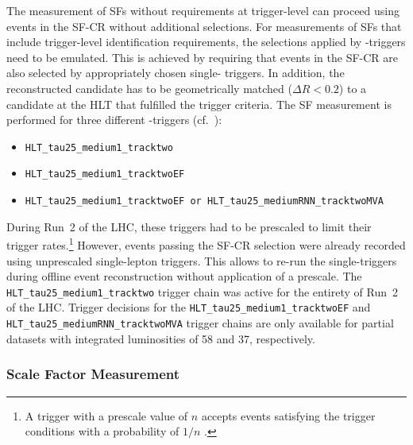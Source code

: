 The measurement of SFs without requirements at trigger-level can proceed using
events in the SF-CR without additional selections. For measurements of SFs that
include trigger-level identification requirements, the selections applied by
\tauhadvis-triggers need to be emulated. This is achieved by requiring that
events in the SF-CR are also selected by appropriately chosen single-\tauhadvis
triggers. In addition, the reconstructed \tauhadvis candidate has to be
geometrically matched ($\Delta R < 0.2$) to a \tauhadvis candidate at the HLT
that fulfilled the trigger criteria. The SF measurement is performed for three
different \tauhadvis-triggers (cf.\ ):
\begin{itemize}
\item \verb|HLT_tau25_medium1_tracktwo| %
\item \verb|HLT_tau25_medium1_tracktwoEF| %
\item \verb|HLT_tau25_medium1_tracktwoEF or HLT_tau25_mediumRNN_tracktwoMVA|
\end{itemize}
During Run~2 of the LHC, these triggers had to be prescaled to limit their
trigger rates.\footnote{A trigger with a prescale value of $n$ accepts events
  satisfying the trigger conditions with a probability of $1 / n$
  \cite{TRIG-2019-04}.} However, events passing the SF-CR selection were already
recorded using unprescaled single-lepton triggers. This allows to re-run the
single-\tauhadvis triggers during offline event reconstruction without
application of a prescale.
The \verb|HLT_tau25_medium1_tracktwo| trigger chain was active for the entirety
of Run~2 of the LHC. Trigger decisions for the
\verb|HLT_tau25_medium1_tracktwoEF| and \verb|HLT_tau25_mediumRNN_tracktwoMVA|
trigger chains are only available for partial datasets with integrated
luminosities of \SI{58}{\ifb} and \SI{37}{\ifb}, respectively.


\subsubsection{Scale Factor Measurement}

